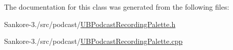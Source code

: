 The documentation for this class was generated from the following files\-:\begin{DoxyCompactItemize}
\item 
Sankore-\/3./src/podcast/\hyperlink{_u_b_podcast_recording_palette_8h}{U\-B\-Podcast\-Recording\-Palette.\-h}\item 
Sankore-\/3./src/podcast/\hyperlink{_u_b_podcast_recording_palette_8cpp}{U\-B\-Podcast\-Recording\-Palette.\-cpp}\end{DoxyCompactItemize}
